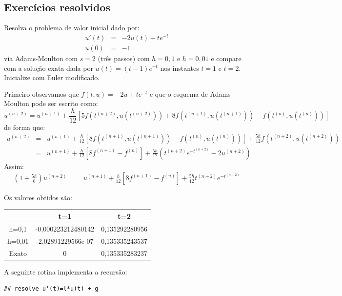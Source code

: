 \subsection*{Exercícios resolvidos}
\begin{exeresol} Resolva o problema de valor inicial dado por:
\begin{eqnarray}
 u'(t)&=& -2u(t) + te^{-t}\\
 u(0)&=&-1
\end{eqnarray}
via Adams-Moulton com $s=2$ (três passos) com $h=0,1$ e $h=0,01$ e compare com a solução exata dada por $u(t)=(t-1)e^{-t}$ nos instantes $t=1$ e $t=2$. Inicialize com Euler modificado.

 \end{exeresol}
\begin{resol}
 Primeiro observamos que $f(t,u)=-2u + te^{-t}$ e que o esquema de Adams-Moulton pode ser escrito como:
 \begin{equation}
  u^{(n+2)}=u^{(n+1)}+\frac{h}{12}\left[5f\left(t^{(n+2)},u(t^{(n+2)})\right)+8f\left(t^{(n+1)},u(t^{(n+1)})\right)-f\left(t^{(n)},u(t^{(n)})\right)\right]
 \end{equation}
 de forma que:
 \begin{eqnarray}
  u^{(n+2)}&=&u^{(n+1)}+\frac{h}{12}\left[8f\left(t^{(n+1)},u(t^{(n+1)})\right)-f\left(t^{(n)},u(t^{(n)})\right)\right]+\frac{5h}{12}f\left(t^{(n+2)},u(t^{(n+2)})\right)\\
  &=&u^{(n+1)}+\frac{h}{12}\left[8f^{(n+1)}-f^{(n)}\right]+\frac{5h}{12}\left(t^{(n+2)}e^{-t^{(n+2)}} -2 u^{(n+2)}\right)
   \end{eqnarray}
 Assim:
 \begin{eqnarray}
  \left(1+\frac{5h}{6}\right)u^{(n+2)}
  &=&u^{(n+1)}+\frac{h}{12}\left[8f^{(n+1)}-f^{(n)}\right]+\frac{5h}{12}t^{(n+2)}e^{-t^{(n+2)}}
  \end{eqnarray}

 Os valores obtidos são:

 \begin{tabular}{|c|c|c|}
 \hline
  &t=1&t=2\\
 \hline
  h=0,1  & -0,000223212480142 & 0,135292280956\\
  h=0,01 & -2,02891229566e-07& 0,135335243537\\
  Exato  & 0 & 0,135335283237\\
  \hline
 \end{tabular}
\ifispython
A seguinte rotina implementa a recursão:
\begin{verbatim}
## resolve u'(t)=l*u(t) + g


\end{verbatim}
\end{resol}

